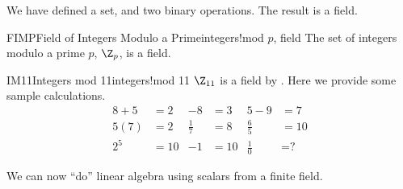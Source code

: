 %
We have defined a set, and two binary operations.  The result is a field.
%
\begin{theorem}{FIMP}{Field of Integers Modulo a Prime}{integers!mod $p$, field}
The set of integers modulo a prime $p$, $\Z_p$, is a field.
\end{theorem}
%
%
\begin{example}{IM11}{Integers mod 11}{integers!mod 11}
$\Z_{11}$ is a field by .  Here we provide some sample calculations.
%
\begin{align*}
8 + 5 &= 2   &   -8 &= 3                   &   5 - 9 &= 7  \\
5(7)&=2       &   \frac{1}{7}&=8       & \frac{6}{5}&=10\\
2^5&=10     &    -1 &= 10                & \frac{1}{0} &=\text{?}
\end{align*}
%
\end{example}
%
We can now ``do'' linear algebra using scalars from a finite field.
%
